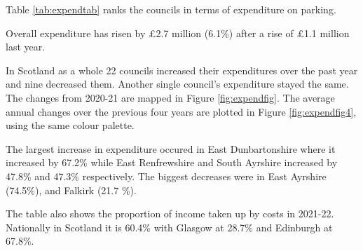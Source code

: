 \documentclass[
  12pt,
]{article}
\begin{document}
Table \ref{tab:expendtab} ranks the councils in terms of expenditure on parking.

Overall expenditure has risen by £2.7 million (6.1\%) after a rise of £1.1 million last year.

In Scotland as a whole 22 councils increased their expenditures over the past year and nine decreased them. Another single council's expenditure stayed the same. The changes from 2020-21 are mapped in Figure \ref{fig:expendfig}. The average annual changes over the previous four years are plotted in Figure \ref{fig:expendfig4}, using the same colour palette.

The largest increase in expenditure occured in East Dunbartonshire where it increased by 67.2\%
while East Renfrewshire and South Ayrshire increased by 47.8\% and 47.3\% respectively. The biggest decreases were in East Ayrshire (74.5\%), and Falkirk (21.7 \%).

The table also shows the proportion of income taken up by costs in 2021-22. Nationally in Scotland it is 60.4\% with Glasgow at 28.7\% and Edinburgh at 67.8\%.

\begingroup\fontsize{8}{10}\selectfont
\end{document}
